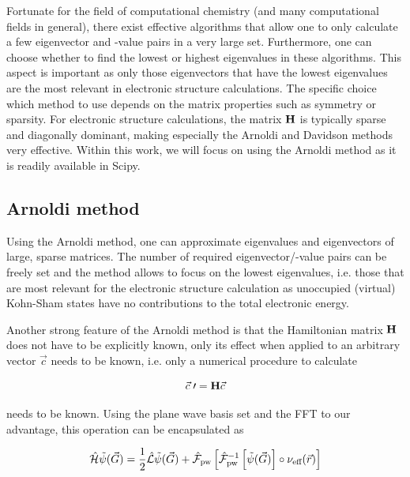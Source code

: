 Fortunate for the field of computational chemistry (and many computational fields in general), there exist effective algorithms that allow one to only calculate a few eigenvector and -value pairs in a very large set. Furthermore, one can choose whether to find the lowest or highest eigenvalues in these algorithms. This aspect is important as only those eigenvectors that have the lowest eigenvalues are the most relevant in electronic structure calculations. The specific choice which method to use depends on the matrix properties such as symmetry or sparsity. For electronic structure calculations, the matrix $\mathbf{H}$ is typically sparse and diagonally dominant, making especially the Arnoldi\cite{1951:arnoldi} and Davidson\cite{1975:davidson} methods very effective. Within this work, we will focus on using the Arnoldi method as it is readily available in Scipy.\cite{arnoldi_scipy}

%
%
%
\subsection{Arnoldi method}

Using the Arnoldi method, one can approximate eigenvalues and eigenvectors of large, sparse matrices. The number of required eigenvector/-value pairs can be freely set and the method allows to focus on the lowest eigenvalues, i.e. those that are most relevant for the electronic structure calculation as unoccupied (virtual) Kohn-Sham states have no contributions to the total electronic energy.

Another strong feature of the Arnoldi method is that the Hamiltonian matrix $\mathbf{H}$ does not have to be explicitly known, only its effect when applied to an arbitrary vector $\vec{c}$ needs to be known, i.e. only a numerical procedure to calculate

\begin{equation}
    \vec{c}\;\prime = \mathbf{H}\vec{c}
\end{equation}

needs to be known. Using the plane wave basis set and the FFT to our advantage, this operation can be encapsulated as

\begin{equation}
    \hat{\mathcal{H}}\tilde{\psi}(\vec{G}) = \frac{1}{2} \hat{\mathcal{L}}\tilde{\psi}(\vec{G}) + \hat{\mathcal{F}}_{\text{pw}}\left[\hat{\mathcal{F}}_{\text{pw}}^{-1}\left[\tilde{\psi}(\vec{G}) \right] \circ \nu_{\text{eff}}(\vec{r}) \right]
    \label{eq:appl_hamil}
\end{equation}

